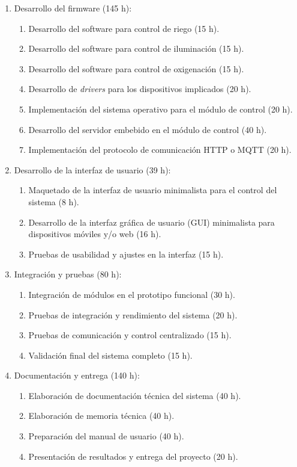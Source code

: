 \documentclass[
11pt, %
]{charter}
\begin{document}
\begin{enumerate}
\item Desarrollo del firmware (145 h):
	\begin{enumerate}
	\item Desarrollo del software para control de riego (15 h).
	\item Desarrollo del software para control de iluminación (15 h).
	\item Desarrollo del software para control de oxigenación (15 h).
	\item Desarrollo de \textit{drivers} para los dispositivos implicados (20 h).
	\item Implementación del sistema operativo para el módulo de control (20 h).
	\item Desarrollo del servidor embebido en el módulo de control (40 h).
	\item Implementación del protocolo de comunicación HTTP o MQTT (20 h).
	\end{enumerate}
\item Desarrollo de la interfaz de usuario (39 h):
	\begin{enumerate}
	\item Maquetado de la interfaz de usuario minimalista para el control del sistema (8 h).
	\item Desarrollo de la interfaz gráfica de usuario (GUI) minimalista para dispositivos móviles y/o web (16 h).
	\item Pruebas de usabilidad y ajustes en la interfaz (15 h).
	\end{enumerate}
\item Integración y pruebas (80 h):
	\begin{enumerate}
	\item Integración de módulos en el prototipo funcional (30 h).
	\item Pruebas de integración y rendimiento del sistema (20 h).
	\item Pruebas de comunicación y control centralizado (15 h).
	\item Validación final del sistema completo (15 h).
	\end{enumerate}
\item Documentación y entrega (140 h):
	\begin{enumerate}
	\item Elaboración de documentación técnica del sistema (40 h).
	\item Elaboración de memoria técnica (40 h).
	\item Preparación del manual de usuario (40 h).
	\item Presentación de resultados y entrega del proyecto (20 h).
	\end{enumerate}
\end{enumerate}
\end{document}

